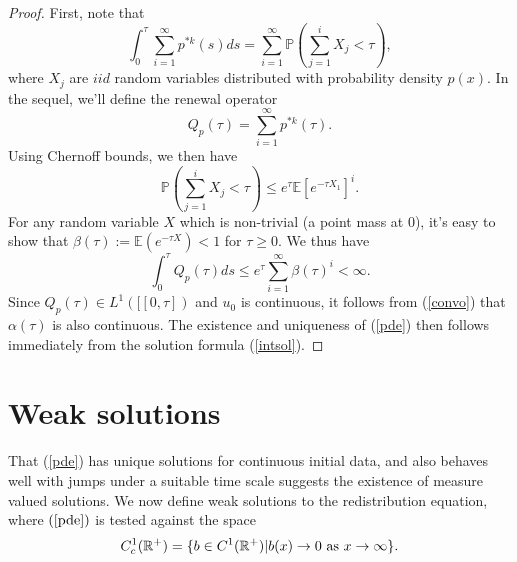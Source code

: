 \begin{proof}
First, note that
\begin{equation}
\int_0^\tau \sum_{i = 1}^\infty p^{*k}(s)ds = \sum_{i = 1}^\infty \mathbb P\left(\sum_{j = 1}^i X_j<\tau\right), 
\end{equation}          
where $X_j$ are $iid$ random variables distributed with probability density $p(x)$.  In the sequel, we'll define the renewal operator
\begin{equation}
Q_p(\tau) = \sum_{i = 1}^\infty p^{*k}(\tau).
\end{equation}Using Chernoff bounds, we then have
\begin{equation}
\mathbb P\left(\sum_{j = 1}^i X_j<\tau\right)\le e^\tau \mathbb{E}[e^{-\tau X_1}]^i.
\end{equation}
For any random variable $X$ which is non-trivial (a point mass at 0), it's easy to show that $\beta(\tau):=\mathbb{E}(e^{-\tau X})<1$ for $\tau\ge 0$. We thus have
\begin{equation}\label{conest}
\int_0^\tau Q_p(\tau)ds  \le e^\tau\sum_{i = 1}^\infty  \mathbb \beta(\tau)^i<\infty.
\end{equation}  
Since $Q_{p}(\tau) \in L^1([[0,\tau])$ and $u_0$ is continuous, it follows from (\ref{convo}) that $\alpha(\tau)$ is also continuous. The existence and uniqueness of (\ref{pde}) then follows immediately from the solution formula (\ref{intsol}).         
\end{proof}

\section{Weak solutions}\label{weaksection}

That (\ref{pde}) has unique solutions for continuous initial data, and also behaves well with jumps under a suitable time scale suggests the existence of measure valued solutions.  We now define weak solutions to the redistribution equation, where $(\ref{pde})$ is tested against the space
\begin{equation}C_c^1(\mathbb{R}^+) = \{b \in C^1(\mathbb{R}^+)|b(x)\rightarrow 0 \hbox{ as }x\rightarrow \infty\}. \nonumber
\end{equation}  

